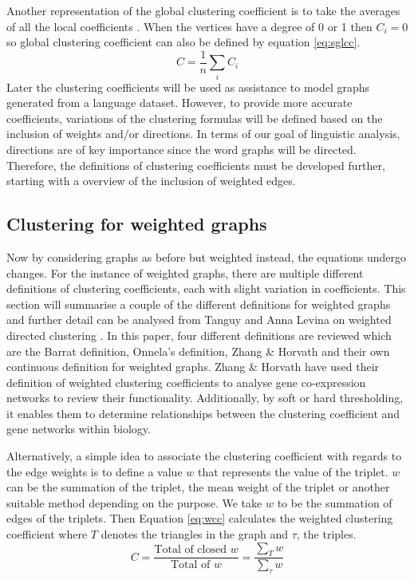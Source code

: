 Another representation of the global clustering coefficient is to take the averages of all the local coefficients \cite{https://doi.org/10.48550/arxiv.1410.1997}. When the vertices have a degree of 0 or 1 then $C_i = 0$ so global clustering coefficient can also be defined by equation \ref{eq:sglcc}.
\begin{equation} \label{eq:sglcc}
C = \frac{1}{n}\sum_i{C_i}
\end{equation}
Later the clustering coefficients will be used as assistance to model graphs generated from a language dataset. However, to provide more accurate coefficients, variations of the clustering formulas will be defined based on the inclusion of weights and/or directions. In terms of our goal of linguistic analysis, directions are of key importance since the word graphs will be directed. Therefore, the definitions of clustering coefficients must be developed further, starting with a overview of the inclusion of weighted edges.

\subsection{Clustering for weighted graphs}
Now by considering graphs as before but weighted instead, the equations undergo changes. For the instance of weighted graphs, there are multiple different definitions of clustering coefficients, each with slight variation in coefficients. This section will summarise a couple of the different definitions for weighted graphs and further detail can be analysed from Tanguy and Anna Levina on weighted directed clustering \cite{PhysRevResearch.3.043124}. In this paper, four different definitions are reviewed which are the Barrat definition, Onnela's definition, Zhang \& Horvath and their own continuous definition for weighted graphs. Zhang \& Horvath \cite{ZhangHorvath+2005} have used their definition of weighted clustering coefficients to analyse gene co-expression networks to review their functionality. Additionally, by soft or hard thresholding, it enables them to determine relationships between the clustering coefficient and gene networks within biology.

Alternatively, a simple idea to associate the clustering coefficient with regards to the edge weights is to define a value $w$ that represents the value of the triplet. $w$ can be the summation of the triplet, the mean weight of the triplet or another suitable method depending on the purpose. We take $w$ to be the summation of edges of the triplets. Then Equation \ref{eq:wcc} calculates the weighted clustering coefficient \cite{opsahl2009clustering} where $T$ denotes the triangles in the graph and $\tau$, the triples.
\begin{equation} \label{eq:wcc}
C = \frac{\text{Total of closed }w}{\text{Total of }w} = \frac{\sum_T{w}}{\sum_\tau{w}}
\end{equation}

